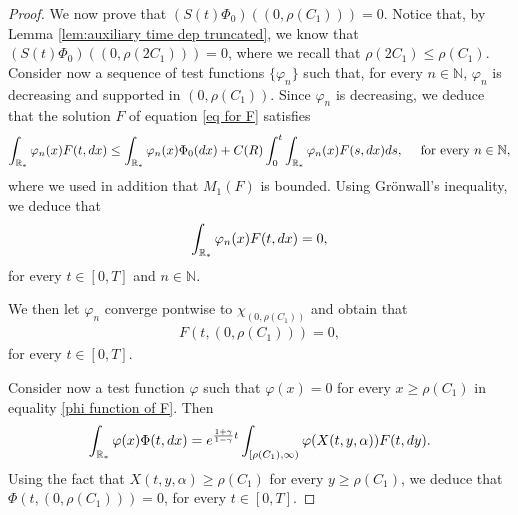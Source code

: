\documentclass[10pt,a4paper]{amsart}
\newcommand{\der}{\textup{d}}
\begin{document}
\begin{proof}
We now prove that $\left(S(t) \Phi_0 \right) ((0, \rho(C_1)))=0$. 
Notice that, by Lemma \ref{lem:auxiliary time dep truncated}, we know that $\left(S(t) \Phi_0 \right) ((0, \rho(2C_{1})))=0$, where we recall that $\rho( 2 C_1) \leq \rho(C_1)$. 
Consider now a sequence of test functions $ \{\varphi_n \}$ such that, for every $n\in\mathbb{N}$, $\varphi_{n}$ is decreasing and supported in $(0, \rho(C_1))$. Since $\varphi_n $ is decreasing, we deduce that the solution $F$ of equation \eqref{eq for F} satisfies 
\begin{align*} 
 \int_{\mathbb R_*} \varphi_n(x) F(t, \der x ) \leq \int_{\mathbb R_*} \varphi_n(x) \Phi_{0}(\der x )+ C(R)  \int_{0}^{t} \int_{\mathbb R_*} \varphi_n(x) F(s, \der x ) \der s, \quad \text{ for every } n \in \mathbb N, 
\end{align*} 
where we used in addition that $M_{1}(F)$ is bounded. Using Gr\"onwall’s inequality, we deduce that
\begin{align*}
    \int_{\mathbb R_*} \varphi_n(x) F(t, \der x ) =0,
\end{align*}
for every $t\in[0,T]$ and $n\in\mathbb{N}$.


We then let $\varphi_{n}$ converge pontwise to $\chi_{(0, \rho(C_1))}$ and obtain that
\begin{align*}
F(t, (0, \rho(C_1))) =0,
\end{align*}
for every $t\in[0,T]$.

Consider now a test function $\varphi$ such that $\varphi(x)=0$ for every $x \geq \rho(C_1)$ in equality \eqref{phi function of F}. Then 
\[
\int_{\mathbb R_* }\varphi(x) \Phi(t, \der x )= e^{\frac{1+\gamma}{1-\gamma}t} \int_{[\rho(C_1), \infty) }\varphi(X(t, y, \alpha) ) F(t, \der y). 
\] 
Using the fact that $X(t, y, \alpha) \geq \rho(C_1)$ for every $y \geq \rho(C_1)$, we deduce that 
$\Phi(t, (0, \rho(C_1)))=0$, for every $t \in [0, T]$. 


\end{proof}
\end{document}
